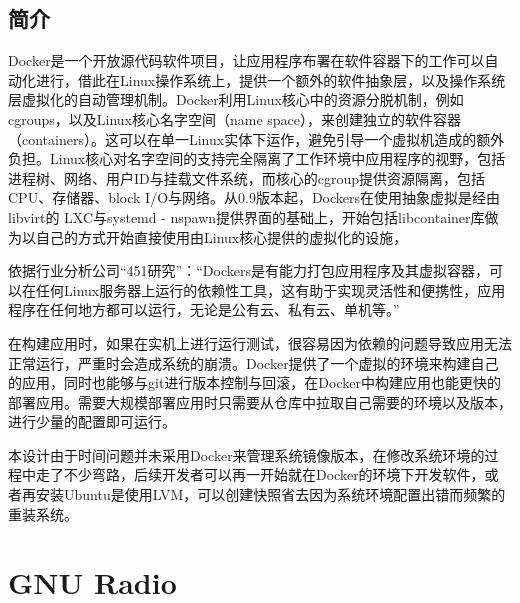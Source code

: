 		\subsection{简介}
			\par Docker是一个开放源代码软件项目，让应用程序布署在软件容器下的工作可以自动化进行，借此在Linux操作系统上，提供一个额外的软件抽象层，以及操作系统层虚拟化的自动管理机制。Docker利用Linux核心中的资源分脱机制，例如cgroups，以及Linux核心名字空间（name space），来创建独立的软件容器（containers）。这可以在单一Linux实体下运作，避免引导一个虚拟机造成的额外负担。Linux核心对名字空间的支持完全隔离了工作环境中应用程序的视野，包括进程树、网络、用户ID与挂载文件系统，而核心的cgroup提供资源隔离，包括CPU、存储器、block I/O与网络。从0.9版本起，Dockers在使用抽象虚拟是经由libvirt的 LXC与systemd - nspawn提供界面的基础上，开始包括libcontainer库做为以自己的方式开始直接使用由Linux核心提供的虚拟化的设施，
			\par 依据行业分析公司“451研究”：“Dockers是有能力打包应用程序及其虚拟容器，可以在任何Linux服务器上运行的依赖性工具，这有助于实现灵活性和便携性，应用程序在任何地方都可以运行，无论是公有云、私有云、单机等。”\cite{ wiki:Docker}
			\par 在构建应用时，如果在实机上进行运行测试，很容易因为依赖的问题导致应用无法正常运行，严重时会造成系统的崩溃。Docker提供了一个虚拟的环境来构建自己的应用，同时也能够与git进行版本控制与回滚，在Docker中构建应用也能更快的部署应用。需要大规模部署应用时只需要从仓库中拉取自己需要的环境以及版本，进行少量的配置即可运行。
			\par 本设计由于时间问题并未采用Docker来管理系统镜像版本，在修改系统环境的过程中走了不少弯路，后续开发者可以再一开始就在Docker的环境下开发软件，或者再安装Ubuntu是使用LVM，可以创建快照省去因为系统环境配置出错而频繁的重装系统。
	\section{GNU Radio}
		\label{sec:gnuradio}
